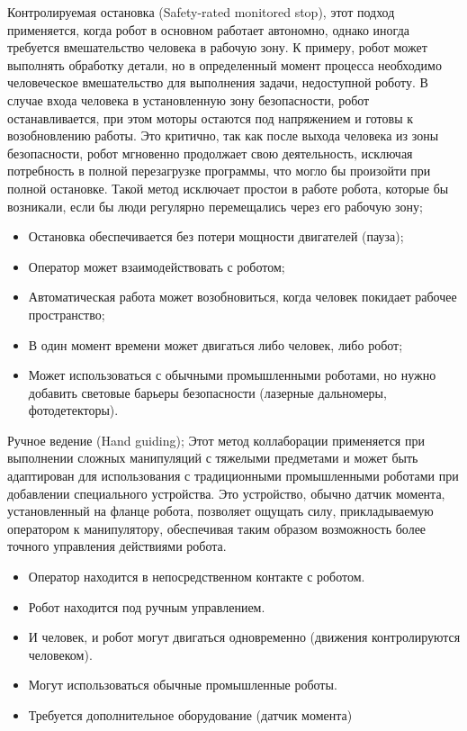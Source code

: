 Контролируемая остановка (Safety-rated monitored stop), этот подход применяется, когда робот в основном работает автономно, однако иногда требуется вмешательство человека в рабочую зону. К примеру, робот может выполнять обработку детали, но в определенный момент процесса необходимо человеческое вмешательство для выполнения задачи, недоступной роботу. В случае входа человека в установленную зону безопасности, робот останавливается, при этом моторы остаются под напряжением и готовы к возобновлению работы. Это критично, так как после выхода человека из зоны безопасности, робот мгновенно продолжает свою деятельность, исключая потребность в полной перезагрузке программы, что могло бы произойти при полной остановке. Такой метод исключает простои в работе робота, которые бы возникали, если бы люди регулярно перемещались через его рабочую зону;
\begin{itemize}
	\item Остановка обеспечивается без потери мощности двигателей (пауза);
	\item Оператор может взаимодействовать с роботом;
	\item Автоматическая работа может возобновиться, когда человек покидает рабочее пространство;
	\item В один момент времени может двигаться либо человек, либо робот;
	\item Может использоваться с обычными промышленными роботами, но нужно добавить световые барьеры безопасности (лазерные дальномеры, фотодетекторы).
\end{itemize}

Ручное ведение (Hand guiding);
Этот метод коллаборации применяется при выполнении сложных манипуляций с тяжелыми предметами и может быть адаптирован для использования с традиционными промышленными роботами при добавлении специального устройства. Это устройство, обычно датчик момента, установленный на фланце робота, позволяет ощущать силу, прикладываемую оператором к манипулятору, обеспечивая таким образом возможность более точного управления действиями робота.

\begin{itemize}
	\item Оператор находится в непосредственном контакте с роботом.
	\item Робот находится под ручным управлением.
	\item И человек, и робот могут двигаться одновременно (движения контролируются человеком).
	\item Могут использоваться обычные промышленные роботы.
	\item Требуется дополнительное оборудование (датчик момента)
\end{itemize}

